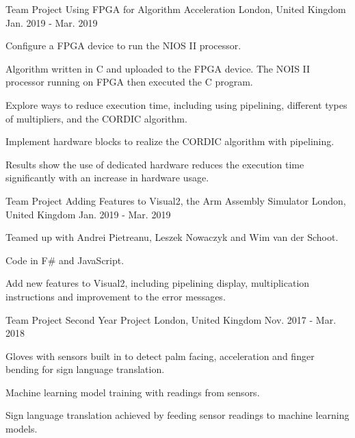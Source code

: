 \begin{cventries}
    \cventry
    {Team Project} %
    {Using FPGA for Algorithm Acceleration} %
    {London, United Kingdom} %
    {Jan. 2019 - Mar. 2019} %
    {
      \begin{cvitems} %
        \item {Configure a FPGA device to run the NIOS II processor.}
        \item {Algorithm written in C and uploaded to the FPGA device. The NOIS II processor running on FPGA then executed the C program.}
        \item {Explore ways to reduce execution time, including using pipelining, different types of multipliers, and the CORDIC algorithm.}
        \item {Implement hardware blocks to realize the CORDIC algorithm with pipelining.}
        \item {Results show the use of dedicated hardware reduces the execution time significantly with an increase in hardware usage.}
      \end{cvitems}
    }
    
    \cventry
    {Team Project} %
    {Adding Features to Visual2, the Arm Assembly Simulator} %
    {London, United Kingdom} %
    {Jan. 2019 - Mar. 2019} %
    {
      \begin{cvitems} %
        \item {Teamed up with Andrei Pietreanu, Leszek Nowaczyk and Wim van der Schoot.}
        \item {Code in F\# and JavaScript.}
        \item {Add new features to Visual2, including pipelining display, multiplication instructions and improvement to the error messages.}
      \end{cvitems}
    }
    
    \cventry
    {Team Project} %
    {Second Year Project} %
    {London, United Kingdom} %
    {Nov. 2017 - Mar. 2018} %
    {
      \begin{cvitems} %
        \item {Gloves with sensors built in to detect palm facing, acceleration and finger bending for sign language translation.}
        \item {Machine learning model training with readings from sensors.}
        \item {Sign language translation achieved by feeding sensor readings to machine learning models.}
      \end{cvitems}
    }
    

\end{cventries}
